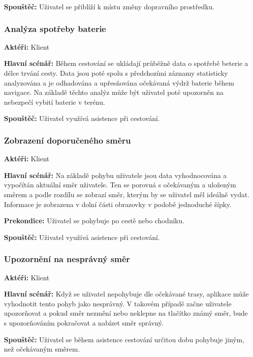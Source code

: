 \documentclass{article}
\newcommand{\usecase}[2]{\subsubsection{#1}\label{#2}}
\begin{document}
\vspace{0.1cm}
\noindent
\textbf{Spouštěč:} Uživatel se přiblíží k místu změny dopravního prostředku.



\usecase{Analýza spotřeby baterie}{analyzabaterie}
\textbf{Aktéři:} Klient

\vspace{0.1cm}
\noindent
\textbf{Hlavní scénář:} Během cestování se ukládají průběžně data o spotřebě beterie a délce trvání
cesty. Data jsou poté spolu s předchozími záznamy statisticky analyzována a je odhadována a upřesňována
očekávaná výdrž baterie během navigace. Na základě těchto analýz může být uživatel poté upozorněn na
nebezpečí vybití baterie v terénu.

\vspace{0.1cm}
\noindent
\textbf{Spouštěč:} Uživatel využívá asistence při cestování.



\usecase{Zobrazení doporučeného směru}{zobrazenismeru}
\textbf{Aktéři:} Klient

\vspace{0.1cm}
\noindent
\textbf{Hlavní scénář:} Na základě pohybu uživatele jsou data vyhodnocována a vypočítán aktuální směr uživatele.
Ten se porovná s očekávaným a uloženým směrem a podle rozdílu se zobrazí směr, kterým by se uživatel měl ideálně
vydat. Informace je zobrazena v dolní části obrazovky v podobě jednoduché šípky.

\vspace{0.1cm}
\noindent
\textbf{Prekondice:} Uživatel se pohybuje po cestě nebo chodníku.

\vspace{0.1cm}
\noindent
\textbf{Spouštěč:} Uživatel využívá asistence při cestování.


\usecase{Upozornění na nesprávný směr}{upozorneninespravnysmer}
\textbf{Aktéři:} Klient

\vspace{0.1cm}
\noindent
\textbf{Hlavní scénář:} Když se uživatel nepohybuje dle očekávané trasy, aplikace může vyhodnotit
tento pohyb jako nesprávný. V takovém případě začne uživatele upozorňovat a pokud směr nezmění nebo
neklepne na tlačítko známý směr, bude s upozorňováním pokračovat a nabízet směr správný.

\vspace{0.1cm}
\noindent
\textbf{Spouštěč:} Uživatel se během asistence cestování určitou dobu pohybuje jiným, než očekávaným směrem.
\end{document}
